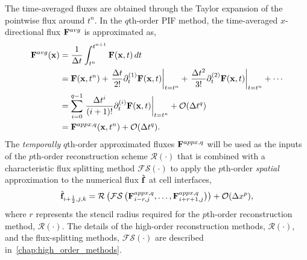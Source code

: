 The time-averaged fluxes
are obtained through the Taylor expansion of the pointwise
flux around \( t^{n} \).
In the \( q \)th-order PIF method,
the time-averaged \( x \)-directional flux \( \mathbf{F}^{avg} \)
is approximated as,
\begin{equation}\label{eq:pif_flux_taylor}
    \begin{split}
        \mathbf{F}^{avg} (\mathbf{x})
        &= \frac{1}{\Delta t} \int^{t^{n + 1}}_{t^n} \mathbf{F}(\mathbf{x}, t) \mathop{dt}\\
        &= \mathbf{F} (\mathbf{x}, t^{n})
            + \left. \frac{\Delta t}{2!} \partial_{t}^{(1)} \mathbf{F} (\mathbf{x}, t) \right|_{t = t^{n}}
            + \left. \frac{\Delta t^{2}}{3!} \partial_{t}^{(2)} \mathbf{F} (\mathbf{x}, t) \right|_{t = t^{n}}
            + \cdots \\
        &= \sum\limits_{i=0}^{q-1}
            \left.\frac{\Delta t^{i}}{(i+1)!} \partial_{t}^{(i)} \mathbf{F} (\mathbf{x}, t) \right|_{t = t^{n}} + \mathcal{O}(\Delta t^{q}) \\
        &= \mathbf{F}^{appx,q} (\mathbf{x}, t^{n}) + \mathcal{O}(\Delta t^{q}).
    \end{split}
\end{equation}
The \textit{temporally} \( q \)th-order approximated fluxes \( \mathbf{F}^{appx, q} \)
will be used
as the inputs of the \( p\)th-order reconstruction scheme \( \mathcal{R}(\cdot) \)
that is combined with a characteristic flux splitting method \( \mathcal{FS}(\cdot) \) 
to apply the \( p \)th-order \textit{spatial} approximation to
the numerical flux \( \hat{\mathbf{f}} \) at cell interfaces,
\begin{equation}\label{eq:num-flx}
    \hat{\mathbf{f}}_{i + \frac{1}{2}, j, k} =
        \mathcal{R}\left(
            \mathcal{FS}\left(\mathbf{F}^{appx, q}_{i-r, j}, \dots,
                \mathbf{F}^{appx, q}_{i+r+1, j}
        \right)
    \right)
    + \mathcal{O}(\Delta x^{p}),
\end{equation}
where \( r \) represents the stencil radius
required for the \( p \)th-order reconstruction method, \( \mathcal{R}(\cdot) \).
The details of the high-order reconstruction methods, \( \mathcal{R}(\cdot) \), and
the flux-splitting methods, \( \mathcal{FS}(\cdot) \) are described in~\cref{chap:high_order_methods}.


